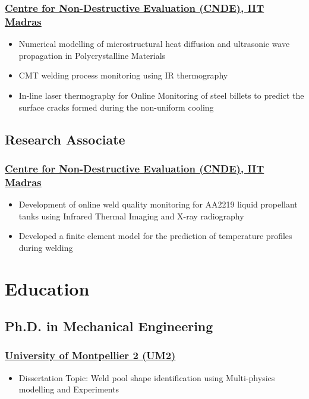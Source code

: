 \documentclass{my_cv}%
\begin{document}
\subsubsection{\href{https://www.cnde.in/}{Centre for Non-Destructive Evaluation (CNDE), IIT Madras}}
\begin{itemize}[leftmargin=0.15in]
\setlength\itemsep{-0.1em}
\color{mygray}
\item Numerical modelling of microstructural heat diffusion and ultrasonic wave propagation in Polycrystalline Materials
\item CMT welding process monitoring using IR thermography 
\item In-line laser thermography for Online Monitoring of steel billets to predict the surface cracks formed during the non-uniform cooling
\end{itemize}
{\color{mygray1} \hdashrule[0.1ex]{18.8cm}{0.2mm}{1mm}}
\subsection{Research Associate}
\subsubsection{\href{https://www.cnde.in/}{Centre for Non-Destructive Evaluation (CNDE), IIT Madras}}
\begin{itemize}[leftmargin=0.15in]
\setlength\itemsep{-0.1em}
\color{mygray}
\item Development of online weld quality monitoring for AA2219 liquid propellant tanks using Infrared Thermal Imaging and X-ray radiography
\item Developed a finite element model for the prediction of temperature profiles during welding
\end{itemize}
\section{Education}
\vspace{2em}
\subsection{Ph.D. in Mechanical Engineering}
\subsubsection{\faInstitution \hspace{0.2em} \href{https://www.umontpellier.fr/en/}{University of Montpellier 2 (UM2)}}
\begin{itemize}[leftmargin=0.15in]
\setlength\itemsep{-0.1em}
\color{mygray}
\item Dissertation Topic: Weld pool shape identification using Multi-physics modelling and Experiments
\end{itemize}
{\color{mygray1} \hdashrule[0.1ex]{18.8cm}{0.2mm}{1mm}}
\end{document}
